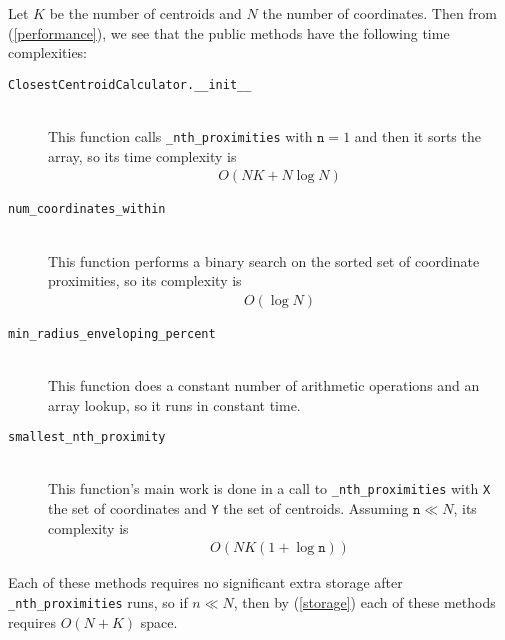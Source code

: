 \documentclass{amsart}
\theoremstyle{definition}
\theoremstyle{definition}
\begin{document}
Let $K$ be the number of centroids and $N$ the number of coordinates.  Then from (\ref{performance}), we see that the public methods have the following time complexities:
\begin{description}
\item[\texttt{ClosestCentroidCalculator.\_\_init\_\_}]\ \\
  This function calls \texttt{\_nth\_proximities} with $\texttt{n}=1$ and then it sorts the array, so its time complexity is
  \begin{align*}
    O(NK + N\log N)
  \end{align*}
\item[\texttt{num\_coordinates\_within}]\ \\
  This function performs a binary search on the sorted set of coordinate proximities, so its complexity is
  \begin{align*}O(\log N)\end{align*}
\item[\texttt{min\_radius\_enveloping\_percent}]\ \\
  This function does a constant number of arithmetic operations and an array lookup, so it runs in constant time.
\item[\texttt{smallest\_nth\_proximity}]\ \\
  This function's main work is done in a call to \texttt{\_nth\_proximities} with \texttt{X} the set of coordinates and \texttt{Y} the set of centroids.  Assuming $\texttt{n} \ll N$, its complexity is
  \begin{align*}O(NK(1+\log \texttt{n}))\end{align*}
\end{description}

Each of these methods requires no significant extra storage after \texttt{\_nth\_proximities} runs, so if $n \ll N$, then by (\ref{storage}) each of these methods requires $O(N+K)$ space.
\end{document}
